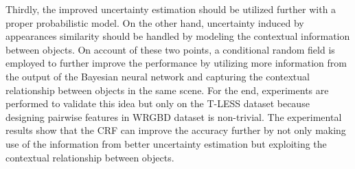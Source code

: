 Thirdly, the improved uncertainty estimation should be utilized further with a proper probabilistic model.
On the other hand, uncertainty induced by appearances similarity should be handled by modeling the contextual information between objects.
On account of these two points, a conditional random field is employed to further improve the performance by utilizing more information from the output of the Bayesian neural network and capturing the contextual relationship between objects in the same scene.
For the end, experiments are performed to validate this idea but only on the T-LESS dataset because designing pairwise features in WRGBD dataset is non-trivial.
The experimental results show that the CRF can improve the accuracy further by not only making use of the information from better uncertainty estimation but exploiting the contextual relationship between objects.

